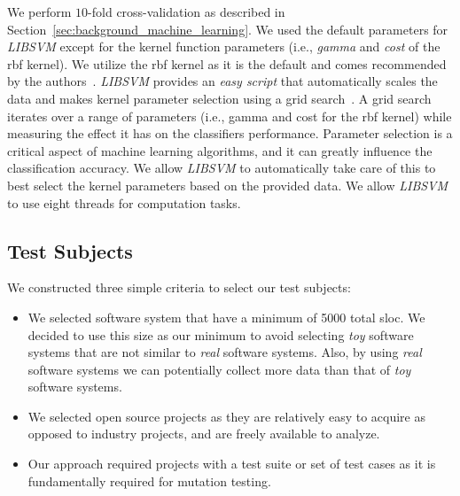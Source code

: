 We perform $10$-fold cross-validation as described in Section~\ref{sec:background_machine_learning}. We used the default parameters for \emph{LIBSVM} except for the kernel function parameters (i.e., \emph{gamma} and \emph{cost} of the \gls{rbf} kernel). We utilize the \gls{rbf} kernel as it is the default and comes recommended by the authors~\cite{HCL03}. \emph{LIBSVM} provides an \emph{easy script} that automatically scales the data and makes kernel parameter selection using a grid search~\cite{HCL03}. A grid search iterates over a range of parameters (i.e., gamma and cost for the \gls{rbf} kernel) while measuring the effect it has on the classifiers performance. Parameter selection is a critical aspect of machine learning algorithms, and it can greatly influence the classification accuracy. We allow \emph{LIBSVM} to automatically take care of this to best select the kernel parameters based on the provided data. We allow \emph{LIBSVM} to use eight threads for computation tasks.

\subsection{Test Subjects}
\label{subsec:experiment_test_subjects}
We constructed three simple criteria to select our test subjects:

\begin{itemize}
  \item We selected software system that have a minimum of 5000 total \gls{sloc}. We decided to use this size as our minimum to avoid selecting \emph{toy} software systems that are not similar to \emph{real} software systems. Also, by using \emph{real} software systems we can potentially collect more data than that of \emph{toy} software systems.
  \item We selected open source projects as they are relatively easy to acquire as opposed to industry projects, and are freely available to analyze.
  \item Our approach required projects with a test suite or set of test cases as it is fundamentally required for mutation testing.
\end{itemize}

